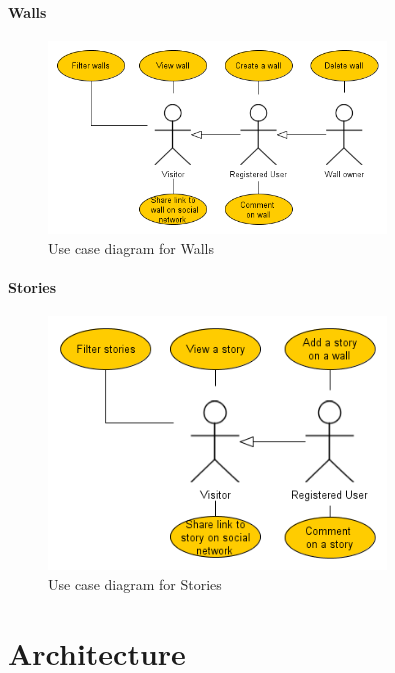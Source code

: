 \documentclass[11pt]{book}
\begin{document}
\subsubsection{Walls}
\begin{figure}[H]
      \centering
      \includegraphics[width=0.8\textwidth]{Figures/Requirements/walls.png} %
      \caption{Use case diagram for Walls}
      \label{fig:req_usecase_walls}
\end{figure}

\subsubsection{Stories}
\begin{figure}[H]
      \centering
      \includegraphics[width=0.8\textwidth]{Figures/Requirements/stories.png} %
      \caption{Use case diagram for Stories}
      \label{fig:req_usecase_stories}
\end{figure}


\chapter{Architecture}
\end{document}
